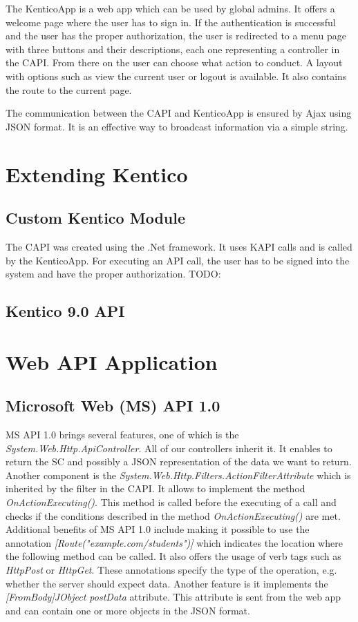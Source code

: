 The KenticoApp is a web app which can be used by global admins. It offers a welcome page where the user has to sign in. If the authentication is successful and the user has the proper authorization, the user is redirected to a menu page with three buttons and their descriptions, each one representing a controller in the CAPI. From there on the user can choose what action to conduct. A layout with options such as view the current user or logout is available. It also contains the route to the current page. 

The communication between the CAPI and KenticoApp is ensured by Ajax using JSON format. It is an effective way to broadcast information via a simple string.

\section{Extending Kentico} \label{implExtendingKentico}
\subsection{Custom Kentico Module}
The CAPI was created using the .Net framework. It uses KAPI calls and is called by the KenticoApp. For executing an API call, the user has to be signed into the system and have the proper authorization. 
TODO: 

\subsection{Kentico 9.0 API}

\section{Web API Application}
\subsection{Microsoft Web (MS) API 1.0}
MS API 1.0 brings several features, one of which is the \textit{System.Web.Http.ApiController}. All of our controllers inherit it. It enables to return the SC and possibly a JSON representation of the data we want to return. Another component is the \textit{System.Web.Http.Filters.ActionFilterAttribute} which is inherited by the filter in the CAPI. It allows to implement the method \textit{OnActionExecuting()}. This method is called before the executing of a call and checks if the conditions described in the method \textit{OnActionExecuting()} are met. Additional benefits of MS API 1.0 include making it possible to use the annotation \textit{[Route("example.com/students")]} which indicates the location where the following method can be called. It also offers the usage of verb tags such as \textit{HttpPost} or \textit{HttpGet}. These annotations specify the type of the operation, e.g. whether the server should expect data. Another feature is it implements the \textit{[FromBody]JObject postData} attribute. This attribute is sent from the web app and can contain one or more objects in the JSON format. 

